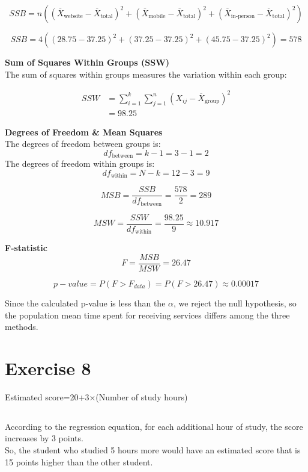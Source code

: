 \documentclass[12pt]{article}
\begin{document}
	\[
	SSB = n \left( (\overline{X}_{\text{website}} - \overline{X}_{\text{total}})^2 + (\overline{X}_{\text{mobile}} - \overline{X}_{\text{total}})^2 + (\overline{X}_{\text{in-person}} - \overline{X}_{\text{total}})^2 \right)
	\]
	
	\[
	SSB = 4((28.75-37.25)^2 + (37.25-37.25)^2 + (45.75-37.25)^2) = 578
	\]
	
	\textbf{Sum of Squares Within Groups (SSW)}\\
	The sum of squares within groups measures the variation within each group:
	
	\begin{align*}
	SSW &= \sum_{i=1}^{k} \sum_{j=1}^{n} (X_{ij} - \overline{X}_{\text{group}})^2 \\
	&= 98.25
	\end{align*}
	
	\textbf{Degrees of Freedom \& Mean Squares}\\
	The degrees of freedom between groups is:
	\[
	df_{\text{between}} = k - 1 = 3 - 1 = 2
	\]
	The degrees of freedom within groups is:
	\[
	df_{\text{within}} = N - k = 12 - 3 = 9
	\]
	
	\[
	MSB = \frac{SSB}{df_{\text{between}}} = \frac{578}{2}=289
	\]
	
	
	\[
	MSW = \frac{SSW}{df_{\text{within}}}= \frac{98.25}{9} \approx 10.917
	\]
	
	\textbf{F-statistic}\\
	
	\[
	F = \frac{MSB}{MSW} = 26.47
	\]
	
	\[
	p-value = P(F > F_{data}) = P(F >26.47) \approx 0.00017
	\]
	
	Since the calculated p-value is less than the $\alpha$, we reject the null hypothesis, so  the population mean time spent for receiving services differs among the three methods.
	\section{Exercise 8}	
	
	Estimated score=20+3×(Number of study hours)
	
	\subsection{}	
	According to the regression equation, for each additional hour of study, the score increases by 3 points.\\		
	So, the student who studied 5 hours more would have an estimated score that is 15 points higher than the other student.
	
\end{document}
